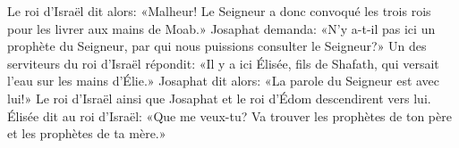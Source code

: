 Le roi d’Israël dit alors:
	«Malheur!
	Le Seigneur a donc convoqué les trois rois pour les livrer aux mains de Moab.»
Josaphat demanda: «N’y a-t-il pas ici un prophète du Seigneur,
	par qui nous puissions consulter le Seigneur?»
	Un des serviteurs du roi d’Israël répondit:
	«Il y a ici Élisée, fils de Shafath, qui versait l’eau sur les mains d’Élie.»
Josaphat dit alors: «La parole du Seigneur est avec lui!»
Le roi d’Israël ainsi que Josaphat et le roi d’Édom descendirent vers lui.
Élisée dit au roi d’Israël:
	«Que me veux-tu?
	Va trouver les prophètes de ton père et les prophètes de ta mère.»
